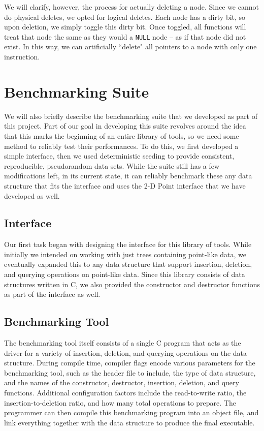\documentclass[10pt]{article}
\begin{document}
We will clarify, however, the process for actually deleting a node. Since we cannot do physical deletes, we opted for logical deletes. Each node has a dirty bit, so upon deletion, we simply toggle this dirty bit. Once toggled, all functions will treat that node the same as they would a {\tt NULL} node -- as if that node did not exist. In this way, we can artificially ``delete" all pointers to a node with only one instruction.

\section{Benchmarking Suite}
We will also briefly describe the benchmarking suite that we developed as part of this project. Part of our goal in developing this suite revolves around the idea that this marks the beginning of an entire library of tools, so we need some method to reliably test their performances. To do this, we first developed a simple interface, then we used deterministic seeding to provide consistent, reproducible, pseudorandom data sets. While the suite still has a few modifications left, in its current state, it can reliably benchmark these any data structure that fits the interface and uses the 2-D Point interface that we have developed as well.

\subsection{Interface}
Our first task began with designing the interface for this library of tools. While initially we intended on working with just trees containing point-like data, we eventually expanded this to any data structure that support insertion, deletion, and querying operations on point-like data. Since this library consists of data structures written in C, we also provided the constructor and destructor functions as part of the interface as well.

\subsection{Benchmarking Tool}
The benchmarking tool itself consists of a single C program that acts as the driver for a variety of insertion, deletion, and querying operations on the data structure. During compile time, compiler flags encode various parameters for the benchmarking tool, such as the header file to include, the type of data structure, and the names of the constructor, destructor, insertion, deletion, and query functions. Additional configuration factors include the read-to-write ratio, the insertion-to-deletion ratio, and how many total operations to prepare. The programmer can then compile this benchmarking program into an object file, and link everything together with the data structure to produce the final executable.
\end{document}
